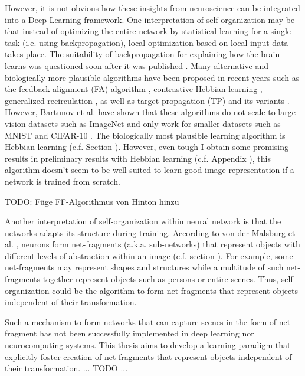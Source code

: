 However, it is not obvious how these insights from neuroscience can be integrated into a Deep Learning framework.
One interpretation of self-organization may be that instead of optimizing the entire network by statistical learning for a single task (i.e. using backpropagation), local optimization based on local input data takes place.
The suitability of backpropagation for explaining how the brain learns was questioned soon after it was published .
Many alternative and biologically more plausible algorithms have been proposed in recent years such as the feedback alignment (FA) algorithm , contrastive Hebbian learning , generalized recirculation , as well as target propagation (TP) and its variants .
However, Bartunov et al.  have shown that these algorithms do not scale to large vision datasets such as ImageNet \cite{deng2009imagenet} and only work for smaller datasets such as MNIST \cite{MNIST} and CIFAR-10 \cite{cifar_10}.
The biologically most plausible learning algorithm is Hebbian learning (c.f. Section ).
However, even tough I obtain some promising results in preliminary results with Hebbian learning (c.f. Appendix ), this algorithm doesn't seem to be well suited to learn good image representation if a network is trained from scratch.

TODO: Füge FF-Algorithmus von Hinton hinzu

Another interpretation of self-organization within neural network is that the networks adapts its structure during training.
According to von der Malsburg et al. \cite{von_der_Malsburg_Stadelmann_Grewe_2022}, neurons form net-fragments (a.k.a. sub-networks) that represent objects with different levels of abstraction within an image (c.f. section ).
For example, some net-fragments may represent shapes and structures while a multitude of such net-fragments together represent objects such as persons or entire scenes.
Thus, self-organization could be the algorithm to form net-fragments that represent objects independent of their transformation.

Such a mechanism to form networks that can capture scenes in the form of net-fragment has not been successfully implemented in deep learning nor neurocomputing systems.
This thesis aims to develop a learning paradigm that explicitly foster creation of net-fragments that represent objects independent of their transformation.
... TODO ...


